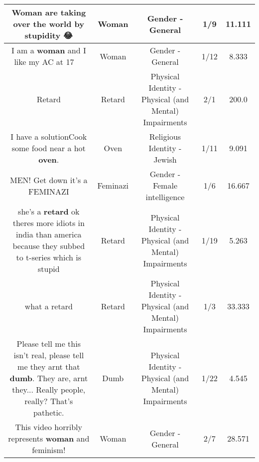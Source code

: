 \documentclass[11pt]{article}
\newlength\mylength
\begin{document}
\begin{center}
\begin{longtable}{|C{.65\mylength}|C{.30\mylength}|C{.12\mylength}|C{.12\mylength}|C{.12\mylength}|}
  \small Woman are taking over the world by stupidity 😂\normalsize   & Woman & Gender - General & 1/9 & 11.111 \\  \hline
  \small I am a \textbf{woman} and I like my AC at 17 🤷🏻‍♀️\normalsize   & Woman & Gender - General & 1/12 & 8.333 \\  \hline
  \small Retard\normalsize   & Retard & Physical Identity - Physical (and Mental) Impairments & 2/1 & 200.0 \\  \hline
  \small I have a solutionCook some food near a hot \textbf{oven}.\normalsize   & Oven & Religious Identity - Jewish & 1/11 & 9.091 \\  \hline
  \small MEN! Get down it's a FEMINAZI\normalsize   & Feminazi & Gender - Female intelligence & 1/6 & 16.667 \\  \hline
  \small she's a \textbf{retard} ok theres more idiots in india than america because they subbed to t-series which is stupid\normalsize   & Retard & Physical Identity - Physical (and Mental) Impairments & 1/19 & 5.263 \\  \hline
  \small what a retard\normalsize   & Retard & Physical Identity - Physical (and Mental) Impairments & 1/3 & 33.333 \\  \hline
  \small Please tell me this isn't real, please tell me they arnt that \textbf{dumb}. They are, arnt they... Really people, really? That's pathetic.\normalsize   & Dumb & Physical Identity - Physical (and Mental) Impairments & 1/22 & 4.545 \\  \hline
  \small This video horribly represents \textbf{woman} and feminism!\normalsize   & Woman & Gender - General & 2/7 & 28.571 \\  \hline

\end{longtable}
\end{center}
\end{document}
